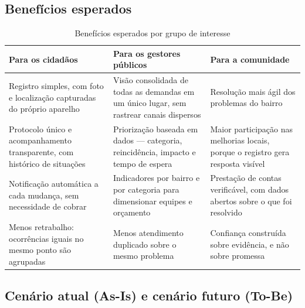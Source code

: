 \documentclass[12pt,a4paper,oneside]{article}
\newcommand{\fonte}[1]{\par\vspace{5pt}{\footnotesize\singlespacing Fonte: #1\par}}
\newcommand{\cab}[1]{\textbf{\footnotesize #1}}
\begin{document}
\subsection{Benefícios esperados}

\begin{table}[H]
\centering
\caption{Benefícios esperados por grupo de interesse}
\label{tab:beneficios}
{\small\singlespacing
\begin{tabularx}{\textwidth}{X X X}
\toprule
\cab{Para os cidadãos} & \cab{Para os gestores públicos} & \cab{Para a
comunidade} \\
\midrule
Registro simples, com foto e localização capturadas do próprio aparelho &
Visão consolidada de todas as demandas em um único lugar, sem rastrear canais
dispersos & Resolução mais ágil dos problemas do bairro \\
\addlinespace
Protocolo único e acompanhamento transparente, com histórico de situações &
Priorização baseada em dados — categoria, reincidência, impacto e tempo de
espera & Maior participação nas melhorias locais, porque o registro gera
resposta visível \\
\addlinespace
Notificação automática a cada mudança, sem necessidade de cobrar &
Indicadores por bairro e por categoria para dimensionar equipes e orçamento &
Prestação de contas verificável, com dados abertos sobre o que foi resolvido \\
\addlinespace
Menos retrabalho: ocorrências iguais no mesmo ponto são agrupadas &
Menos atendimento duplicado sobre o mesmo problema & Confiança construída sobre
evidência, e não sobre promessa \\
\bottomrule
\end{tabularx}}
\fonte{elaborado pelos autores (2026).}
\end{table}

\subsection{Cenário atual (As-Is) e cenário futuro (To-Be)}
\end{document}
